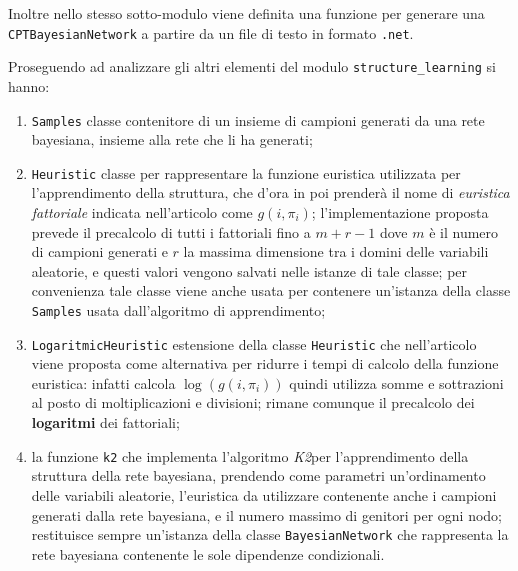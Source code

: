 Inoltre nello stesso sotto-modulo viene definita una funzione per generare una
\texttt{CPTBayesianNetwork} a partire da un file di testo in formato \texttt{.net}.

Proseguendo ad analizzare gli altri elementi del modulo \texttt{structure\_learning} si hanno:
\begin{enumerate}[resume]
      \item \texttt{Samples} classe contenitore di un insieme di campioni generati da una rete bayesiana, insieme alla rete
            che li ha generati;
      \item \texttt{Heuristic} classe per rappresentare la funzione euristica utilizzata per l'apprendimento della struttura,
            che d'ora in poi prenderà il nome di \textit{euristica fattoriale}
            indicata nell'articolo come $g(i, \pi_i)$; l'implementazione proposta prevede il precalcolo
            di tutti i fattoriali fino a $m + r - 1$ dove $m$ è il numero di campioni generati e $r$ la massima dimensione tra i domini
            delle variabili aleatorie, e questi valori vengono salvati nelle istanze di tale classe; per convenienza tale classe viene anche
            usata per contenere un'istanza della classe \texttt{Samples} usata dall'algoritmo di apprendimento;
      \item \texttt{LogaritmicHeuristic} estensione della classe \texttt{Heuristic} che nell'articolo viene proposta come
            alternativa per ridurre i tempi di calcolo della funzione euristica: infatti calcola $\log(g(i, \pi_i))$ quindi utilizza
            somme e sottrazioni al posto di moltiplicazioni e divisioni; rimane comunque il precalcolo dei
            \textbf{logaritmi} dei fattoriali;
      \item la funzione \texttt{k2} che implementa l'algoritmo \textit{K2}\footnotemark[3] per l'apprendimento
            della struttura della rete bayesiana, prendendo come parametri un'ordinamento delle variabili
            aleatorie, l'euristica da utilizzare contenente anche i campioni generati dalla rete bayesiana, e
            il numero massimo di genitori per ogni nodo; restituisce sempre un'istanza della classe
            \texttt{BayesianNetwork} che rappresenta la rete bayesiana contenente le sole dipendenze
            condizionali.
\end{enumerate}
